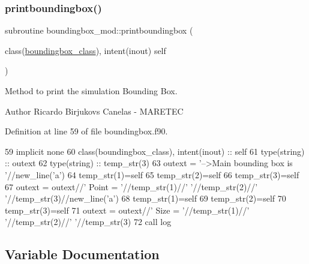 \subsubsection{\texorpdfstring{printboundingbox()}{printboundingbox()}}
{\footnotesize\ttfamily subroutine boundingbox\+\_\+mod\+::printboundingbox (\begin{DoxyParamCaption}\item[{class(\mbox{\hyperlink{structboundingbox__mod_1_1boundingbox__class}{boundingbox\+\_\+class}}), intent(inout)}]{self }\end{DoxyParamCaption})\hspace{0.3cm}{\ttfamily [private]}}



Method to print the simulation Bounding Box. 

\begin{DoxyAuthor}{Author}
Ricardo Birjukovs Canelas -\/ M\+A\+R\+E\+T\+EC 
\end{DoxyAuthor}


Definition at line 59 of file boundingbox.\+f90.


\begin{DoxyCode}
59     \textcolor{keywordtype}{implicit none}
60     \textcolor{keywordtype}{class}(boundingbox\_class), \textcolor{keywordtype}{intent(inout)} :: self
61     \textcolor{keywordtype}{type}(string) :: outext
62     \textcolor{keywordtype}{type}(string) :: temp\_str(3)
63     outext = \textcolor{stringliteral}{'-->Main bounding box is '}//new\_line(\textcolor{stringliteral}{'a'})
64     temp\_str(1)=self%
65     temp\_str(2)=self%
66     temp\_str(3)=self%
67     outext = outext//\textcolor{stringliteral}{'       Point = '}//temp\_str(1)//\textcolor{stringliteral}{' '}//temp\_str(2)//\textcolor{stringliteral}{' '}//temp\_str(3)//new\_line(\textcolor{stringliteral}{'a'})
68     temp\_str(1)=self%
69     temp\_str(2)=self%
70     temp\_str(3)=self%
71     outext = outext//\textcolor{stringliteral}{'       Size = '}//temp\_str(1)//\textcolor{stringliteral}{' '}//temp\_str(2)//\textcolor{stringliteral}{' '}//temp\_str(3)    
72     \textcolor{keyword}{call }log%
\end{DoxyCode}


\subsection{Variable Documentation}
\mbox{\label{namespaceboundingbox__mod_a45e98e492bb546328c98f618a74622ec}} 
